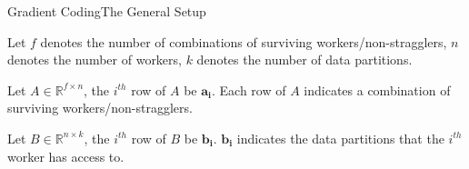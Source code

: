 \documentclass{beamer}
\begin{document}
\begin{frame}{Gradient Coding}{The General Setup}

\begin{definition}
    Let $f$ denotes the number of combinations of surviving workers/non-stragglers, $n$ denotes the number of workers, $k$ denotes the number of data partitions.
\end{definition}

\begin{definition}
    Let $A \in \mathbb{R}^{f \times n}$, the $i^{th}$ row of $A$ be $\boldsymbol{a_i}$. Each row of $A$ indicates a combination of surviving workers/non-stragglers.
\end{definition}

\begin{definition}
    Let $B \in \mathbb{R}^{n \times k}$, the $i^{th}$ row of $B$ be $\boldsymbol{b_i}$. $\boldsymbol{b_i}$ indicates the data partitions that the $i^{th}$ worker has access to.
\end{definition}

\end{frame}
\end{document}
